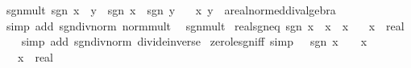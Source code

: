 \begin{isabellebody}
\endisatagproof
{\isafoldproof}%
%
\isadelimproof
\isanewline
%
\endisadelimproof
\isanewline
{}\isamarkupfalse%
\ sgn{\isacharunderscore}{\kern0pt}mult{\isacharcolon}{\kern0pt}\ {\isachardoublequoteopen}sgn\ {\isacharparenleft}{\kern0pt}x\ {\isacharasterisk}{\kern0pt}\ y{\isacharparenright}{\kern0pt}\ {\isacharequal}{\kern0pt}\ sgn\ x\ {\isacharasterisk}{\kern0pt}\ sgn\ y{\isachardoublequoteclose}\isanewline
\ \ \ x\ y\ {\isacharcolon}{\kern0pt}{\isacharcolon}{\kern0pt}\ {\isachardoublequoteopen}{\isacharprime}{\kern0pt}a{\isacharcolon}{\kern0pt}{\isacharcolon}{\kern0pt}real{\isacharunderscore}{\kern0pt}normed{\isacharunderscore}{\kern0pt}div{\isacharunderscore}{\kern0pt}algebra{\isachardoublequoteclose}\isanewline
%
\isadelimproof
\ \ %
\endisadelimproof
%
\isatagproof
{}\isamarkupfalse%
\ {\isacharparenleft}{\kern0pt}simp\ add{\isacharcolon}{\kern0pt}\ sgn{\isacharunderscore}{\kern0pt}div{\isacharunderscore}{\kern0pt}norm\ norm{\isacharunderscore}{\kern0pt}mult{\isacharparenright}{\kern0pt}%
\endisatagproof
{\isafoldproof}%
%
\isadelimproof
\isanewline
%
\endisadelimproof
\isanewline
{}\isamarkupfalse%
\ {\isacharparenleft}{\kern0pt}\ sgn{\isacharunderscore}{\kern0pt}mult\isanewline
\isanewline
{}\isamarkupfalse%
\ real{\isacharunderscore}{\kern0pt}sgn{\isacharunderscore}{\kern0pt}eq{\isacharcolon}{\kern0pt}\ {\isachardoublequoteopen}sgn\ x\ {\isacharequal}{\kern0pt}\ x\ {\isacharslash}{\kern0pt}\ {\isasymbar}x{\isasymbar}{\isachardoublequoteclose}\isanewline
\ \ \ x\ {\isacharcolon}{\kern0pt}{\isacharcolon}{\kern0pt}\ real\isanewline
%
\isadelimproof
\ \ %
\endisadelimproof
%
\isatagproof
{}\isamarkupfalse%
\ {\isacharparenleft}{\kern0pt}simp\ add{\isacharcolon}{\kern0pt}\ sgn{\isacharunderscore}{\kern0pt}div{\isacharunderscore}{\kern0pt}norm\ divide{\isacharunderscore}{\kern0pt}inverse{\isacharparenright}{\kern0pt}%
\endisatagproof
{\isafoldproof}%
%
\isadelimproof
\isanewline
%
\endisadelimproof
\isanewline
{}\isamarkupfalse%
\ zero{\isacharunderscore}{\kern0pt}le{\isacharunderscore}{\kern0pt}sgn{\isacharunderscore}{\kern0pt}iff\ {\isacharbrackleft}{\kern0pt}simp{\isacharbrackright}{\kern0pt}{\isacharcolon}{\kern0pt}\ {\isachardoublequoteopen}{}\ {\isasymle}\ sgn\ x\ {\isasymlongleftrightarrow}\ {}\ {\isasymle}\ x{\isachardoublequoteclose}\isanewline
\ \ \ x\ {\isacharcolon}{\kern0pt}{\isacharcolon}{\kern0pt}\ real\isanewline

\end{isabellebody}
